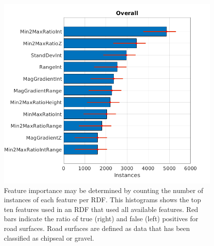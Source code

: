 \documentclass[numbered,pdftex]{ohio-etd}
\begin{document}
{%
		
		\begin{figure}[H]
			\centering
			\includegraphics[width=0.7\linewidth]{Defense_Images/Top_Ten_Histogram}
			\caption[Example Feature Importance]{Feature importance may be determined by counting the number of instances of each feature per RDF. This histograms shows the top ten features used in an RDF that used all available features. Red bars indicate the ratio of true (right) and false (left) positives for road surfaces. Road surfaces are defined as data that has been classified as chipseal or gravel. }
			\label{fig:RAN_Top_Ten_Histogram}
		\end{figure}
	
}
\end{document}
